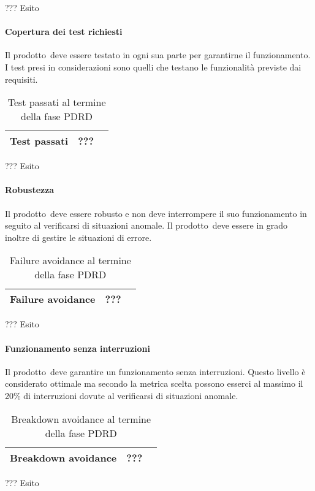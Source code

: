 \documentclass[../PianoDiQualifica.tex]{subfiles}
\begin{document}
\begin{appendices}
			??? Esito
			
			\paragraph{Copertura dei test richiesti}
				Il prodotto\g\ deve essere testato in ogni sua parte per garantirne il funzionamento. I test presi in considerazioni sono quelli che testano le funzionalità previste dai requisiti.
			\begin{table}[H]
				\centering
				\begin{tabular}{l * {2}{c}}
					\midrule
					Test passati & ??? \\
					\midrule
				\end{tabular}
				\caption{Test passati al termine della fase PDRD}
				\label{tab:copertura_test}
			\end{table}
			
			??? Esito
			
			\paragraph{Robustezza}
				Il prodotto\g\ deve essere robusto e non deve interrompere il suo funzionamento in seguito al verificarsi di situazioni anomale\g. Il prodotto\g\ deve essere in grado inoltre di gestire le situazioni di errore.
			\begin{table}[H]
				\centering
				\begin{tabular}{l * {2}{c}}
					\midrule
					Failure avoidance & ??? \\
					\midrule
				\end{tabular}
				\caption{Failure avoidance al termine della fase PDRD}
				\label{tab:failure_avoidance}
			\end{table}
			
			??? Esito
			
			\paragraph{Funzionamento senza interruzioni}
				Il prodotto\g\ deve garantire un funzionamento senza interruzioni. Questo livello è considerato ottimale ma secondo la metrica scelta possono esserci al massimo il 20\% di interruzioni dovute al verificarsi di situazioni anomale\g.
			\begin{table}[H]
				\centering
				\begin{tabular}{l * {2}{c}}
					\midrule
					Breakdown avoidance & ??? \\
					\midrule
				\end{tabular}
				\caption{Breakdown avoidance al termine della fase PDRD}
				\label{tab:breackdown_avoidance}
			\end{table}	
			
			??? Esito
				
	
\end{appendices}
\end{document}

